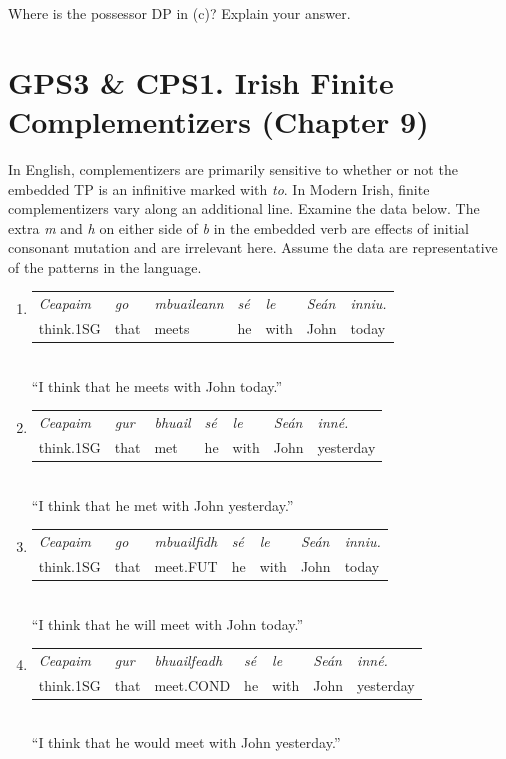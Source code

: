 ﻿\documentclass[11pt]{article}
\begin{document}
Where is the possessor DP in (c)? Explain your answer.

\newpage
\section*{GPS3 \& CPS1. Irish Finite Complementizers (Chapter 9)}

In English, complementizers are primarily sensitive to whether or not the embedded TP is an infinitive marked with \textit{to}. In Modern Irish, finite complementizers vary along an additional line. Examine the data below. The extra \textit{m} and \textit{h} on either side of \textit{b} in the embedded verb are effects of initial consonant mutation and are irrelevant here. Assume the data are representative of the patterns in the language.

\begin{enumerate}
  \item[(a)]
  \begin{tabular}[t]{@{}l@{\quad}l@{\quad}l@{\quad}l@{\quad}l@{\quad}l@{\quad}l@{}}
    \textit{Ceapaim} & \textit{go} & \textit{mbuaileann} & \textit{sé} & \textit{le} & \textit{Seán} & \textit{inniu.}\\
    think.1SG & that & meets & he & with & John & today
  \end{tabular}\\
  ``I think that he meets with John today.''

  \item[(b)]
  \begin{tabular}[t]{@{}l@{\quad}l@{\quad}l@{\quad}l@{\quad}l@{\quad}l@{\quad}l@{}}
    \textit{Ceapaim} & \textit{gur} & \textit{bhuail} & \textit{sé} & \textit{le} & \textit{Seán} & \textit{inné.}\\
    think.1SG & that & met & he & with & John & yesterday
  \end{tabular}\\
  ``I think that he met with John yesterday.''

  \item[(c)]
  \begin{tabular}[t]{@{}l@{\quad}l@{\quad}l@{\quad}l@{\quad}l@{\quad}l@{\quad}l@{}}
    \textit{Ceapaim} & \textit{go} & \textit{mbuailfidh} & \textit{sé} & \textit{le} & \textit{Seán} & \textit{inniu.}\\
    think.1SG & that & meet.FUT & he & with & John & today
  \end{tabular}\\
  ``I think that he will meet with John today.''

  \item[(d)]
  \begin{tabular}[t]{@{}l@{\quad}l@{\quad}l@{\quad}l@{\quad}l@{\quad}l@{\quad}l@{}}
    \textit{Ceapaim} & \textit{gur} & \textit{bhuailfeadh} & \textit{sé} & \textit{le} & \textit{Seán} & \textit{inné.}\\
    think.1SG & that & meet.COND & he & with & John & yesterday
  \end{tabular}\\
  ``I think that he would meet with John yesterday.''
\end{enumerate}
\end{document}
